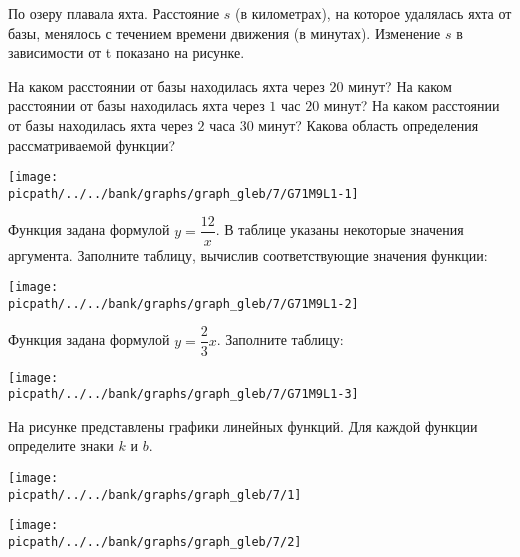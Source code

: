 
\begin{class}[number=1]
	\begin{listofex}
		\item По озеру плавала яхта. Расстояние \(s\) (в километрах), на которое удалялась яхта от базы, менялось с течением времени движения (в минутах). Изменение \(s\) в зависимости от t показано на рисунке. 
		\begin{tasks}
			\task На каком расстоянии от базы находилась яхта через \(20\) минут?
			\task На каком расстоянии от базы находилась яхта через \(1\) час \(20\) минут?
			\task На каком расстоянии от базы находилась яхта через \(2\) часа \(30\) минут?
			\task Какова область определения рассматриваемой функции?
		\end{tasks}
		\begin{minipage}[t]{\linewidth}
			\texttt{[image: \\picpath/../../bank/graphs/graph\_gleb/7/G71M9L1-1]}
		\end{minipage}
		\item Функция задана формулой \(y=\dfrac{ 12 }{ x }\). В таблице указаны некоторые значения аргумента. Заполните таблицу, вычислив соответствующие значения функции:
		\begin{minipage}[t]{\linewidth}
			\texttt{[image: \\picpath/../../bank/graphs/graph\_gleb/7/G71M9L1-2]}
		\end{minipage}
		\item Функция задана формулой \(y=\dfrac{ 2}{ 3 }x\). Заполните таблицу:
		\begin{minipage}[t]{\linewidth}
			\texttt{[image: \\picpath/../../bank/graphs/graph\_gleb/7/G71M9L1-3]}
		\end{minipage}
		\item На рисунке представлены графики линейных функций. Для каждой функции определите знаки \(k\) и \(b\). \\
		\begin{minipage}[t]{0.45\linewidth}
			\texttt{[image: \\picpath/../../bank/graphs/graph\_gleb/7/1]}
		\end{minipage}
		\gapwidth
		\begin{minipage}[t]{0.45\linewidth}
			\texttt{[image: \\picpath/../../bank/graphs/graph\_gleb/7/2]}
		\end{minipage}
		\item 

\end{listofex}
\end{class}

